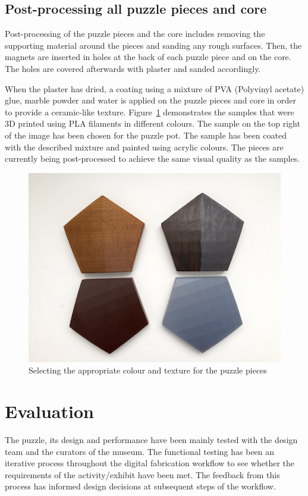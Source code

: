 \documentclass[acmlarge,screen,dvipsnames]{acmart}
\begin{document}
\subsection{Post-processing all puzzle pieces and core}

Post-processing of the puzzle pieces and the core includes removing
the supporting material around the pieces and sanding any rough
surfaces. Then, the magnets are inserted in holes at the back of each
puzzle piece and on the core. The holes are covered afterwards with
plaster and sanded accordingly.

When the plaster has dried, a coating using a mixture of PVA
(Polyvinyl acetate) glue, marble powder and water is applied on the
puzzle pieces and core in order to provide a ceramic-like
texture. Figure~\ref{fig:col} demonstrates the samples that were 3D
printed using PLA filaments in different colours. The sample on the
top right of the image has been chosen for the puzzle pot. The sample
has been coated with the described mixture and painted using acrylic
colours. The pieces are currently being post-processed to achieve the
same visual quality as the samples.
%
\begin{figure}[h]
  \centering
  \includegraphics[width=0.6\linewidth]{images/colours}
  \caption{\label{fig:col}
    Selecting the appropriate colour and texture for the puzzle pieces}
\end{figure}

\section{Evaluation}
\label{eva}

The puzzle, its design and performance have been mainly tested with
the design team and the curators of the museum. The functional testing
has been an iterative process throughout the digital fabrication
workflow to see whether the requirements of the activity/exhibit have
been met. The feedback from this process has informed design decisions
at subsequent steps of the workflow.
\end{document}
